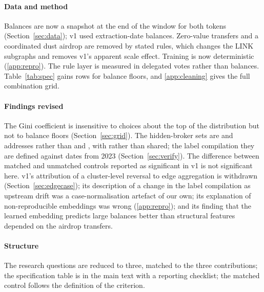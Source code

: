 \paragraph{Data and method}
Balances are now a snapshot at the end of the window for both tokens
(Section~\ref{sec:data}); v1 used extraction-date balances. Zero-value
transfers and a coordinated dust airdrop are removed by stated rules, which
changes the LINK subgraphs and removes v1's apparent scale effect. Training
is now deterministic (\ref{app:repro}). The rule layer is measured in
delegated votes rather than balances. Table~\ref{tab:spec} gains rows for
balance floors, and \ref{app:cleaning} gives the full combination grid.

\paragraph{Findings revised}
The Gini coefficient is insensitive to choices about the top of the
distribution but not to balance floors (Section~\ref{sec:grid}). The
hidden-broker sets are  and  addresses rather
than  and , with 
rather than  shared; the label compilation they are
defined against dates from 2023 (Section~\ref{sec:verify}). The difference
between matched and unmatched controls reported as significant in v1 is not
significant here. v1's attribution of a cluster-level reversal to edge
aggregation is withdrawn (Section~\ref{sec:edgecase}); its description of a
change in the label compilation as upstream drift was a case-normalisation
artefact of our own; its explanation of non-reproducible embeddings was
wrong (\ref{app:repro}); and its finding that the learned embedding
predicts large balances better than structural features depended on the
airdrop transfers.

\paragraph{Structure}
The research questions are reduced to three, matched to the three
contributions; the specification table is in the main text with a reporting
checklist; the matched control follows the definition of the criterion.
